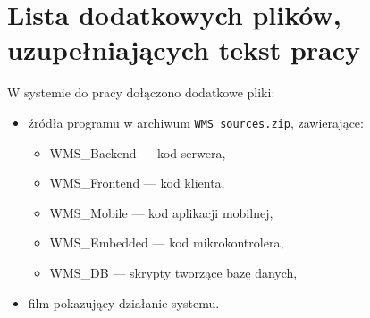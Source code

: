 \chapter{Lista dodatkowych plików, uzupełniających tekst pracy}



W systemie do pracy dołączono dodatkowe pliki:
\begin{itemize}
    \item źródła programu w archiwum \texttt{WMS\_sources.zip}, zawierające:
          \begin{itemize}
              \item WMS\_Backend --- kod serwera,
              \item WMS\_Frontend --- kod klienta,
              \item WMS\_Mobile --- kod aplikacji mobilnej,
              \item WMS\_Embedded --- kod mikrokontrolera,
              \item WMS\_DB --- skrypty tworzące bazę danych,
          \end{itemize}
    \item film pokazujący działanie systemu.
\end{itemize}
